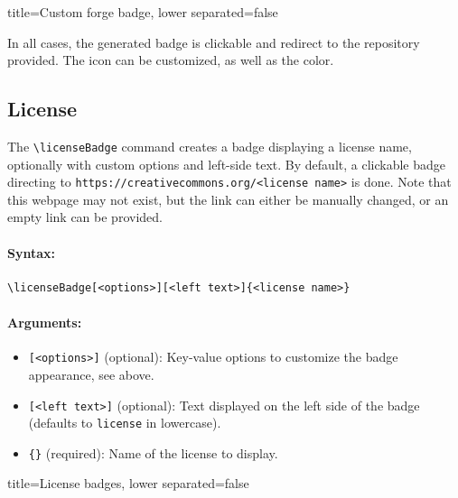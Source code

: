 \begin{tcblisting}{title={Custom forge badge}, lower separated=false}
\end{tcblisting}

In all cases, the generated badge is clickable and redirect to the repository provided.
The icon can be customized, as well as the color.

\subsection{License}


The \texttt{\textbackslash licenseBadge} command creates a badge displaying a license name, optionally with custom options and left-side text.
By default, a clickable badge directing to \texttt{https://creativecommons.org/<license name>} is done.
Note that this webpage may not exist, but the link can either be manually changed, or an empty link can be provided.

\paragraph{Syntax:}
\begin{verbatim}
\licenseBadge[<options>][<left text>]{<license name>}
\end{verbatim}

\paragraph{Arguments:}
\begin{itemize}
    \item \texttt{[<options>]} (optional): Key-value options to customize the badge appearance, see above.
    \item \texttt{[<left text>]} (optional): Text displayed on the left side of the badge (defaults to \texttt{license} in lowercase).
    \item \texttt{\{<license name>\}} (required): Name of the license to display.
\end{itemize}


\begin{tcblisting}{title={License badges}, lower separated=false}
\end{tcblisting}


